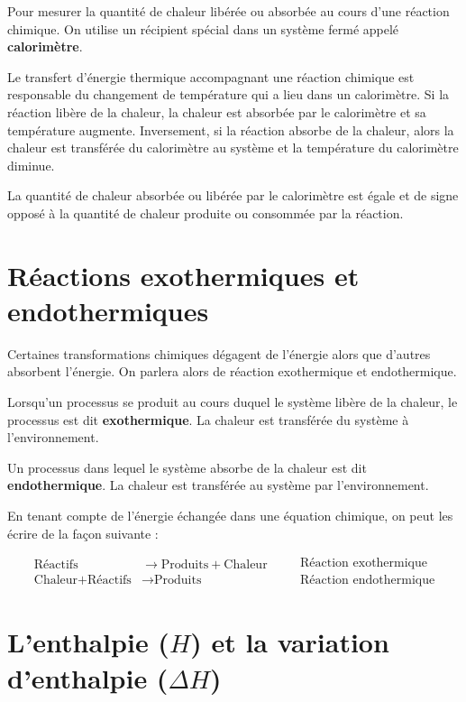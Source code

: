 \documentclass[
  11pt,
  french,
  a4paper,
  openany]{book}
\begin{document}
Pour mesurer la quantité de chaleur libérée ou absorbée au cours d'une réaction chimique. On utilise un récipient spécial dans un système fermé appelé \textbf{calorimètre}.

Le transfert d'énergie thermique accompagnant une réaction chimique est responsable du changement de température qui a lieu dans un calorimètre. Si la réaction libère de la chaleur, la chaleur est absorbée par le calorimètre et sa température augmente. Inversement, si la réaction absorbe de la chaleur, alors la chaleur est transférée du calorimètre au système et la température du calorimètre diminue.

La quantité de chaleur absorbée ou libérée par le calorimètre est égale et de signe opposé à la quantité de chaleur produite ou consommée par la réaction.

\clearpage

\hypertarget{ruxe9actions-exothermiques-et-endothermiques}{%
\section{Réactions exothermiques et endothermiques}\label{ruxe9actions-exothermiques-et-endothermiques}}

Certaines transformations chimiques dégagent de l'énergie alors que d'autres absorbent l'énergie. On parlera alors de réaction exothermique et endothermique.

Lorsqu'un processus se produit au cours duquel le système libère de la chaleur, le processus est dit \textbf{exothermique}. La chaleur est transférée du système à l'environnement.

Un processus dans lequel le système absorbe de la chaleur est dit \textbf{endothermique}. La chaleur est transférée au système par l'environnement.

En tenant compte de l'énergie échangée dans une équation chimique, on peut les écrire de la façon suivante :

\[
\begin{split}
  \text{Réactifs} & \rightarrow \text{Produits} + \text{Chaleur} \\
  \text{Chaleur} + \text{Réactifs} & \rightarrow \text{Produits}
\end{split}
\quad
\begin{split}
  &\text{Réaction exothermique} \\
  &\text{Réaction endothermique}
\end{split}
\]

\hypertarget{lenthalpie-h-et-la-variation-denthalpie-delta-h}{%
\section{\texorpdfstring{L'enthalpie (\(H\)) et la variation d'enthalpie (\(\Delta H\))}{L'enthalpie (H) et la variation d'enthalpie (\textbackslash Delta H)}}\label{lenthalpie-h-et-la-variation-denthalpie-delta-h}}
\end{document}
